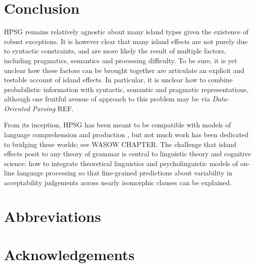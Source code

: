\documentclass[output=paper]{langsci/langscibook}
\begin{document}
\section{Conclusion}

HPSG remains relatively agnostic about many island types given the existence of robust exceptions.
It is however clear that many island effects are not purely due to syntactic constraints, and are more likely
the result of multiple factors, including pragmatics, semantics and processing difficulty.
To be sure, it is yet unclear how these factors can be brought together are articulate an explicit
and testable account of island effects. In particular, it is unclear how to combine probabilistic information with syntactic, semantic and pragmatic representations, although one fruitful avenue of approach to this problem may be via  {\it Data-Oriented Parsing} REF.  


From its inception, HPSG has been meant to be compatible with models of language comprehension and production \citep{sagser,Sag:Wasow:ta,Sag:Wasow:ta2}, but not much work has been dedicated to bridging these worlds; see WASOW CHAPTER. The challenge that island effects posit to any theory of grammar is central to linguistic theory and cognitive science: how to integrate theoretical linguistics and psycholinguistic models of on-line language processing so that fine-grained predictions about variability in acceptability judgements across nearly isomorphic clauses can be explained.


 
\section*{Abbreviations}
\section*{Acknowledgements}

\printbibliography[heading=subbibliography,notkeyword=this] 
\end{document}

